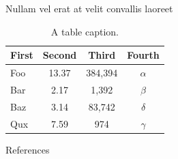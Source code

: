 \documentclass[final]{beamer}
\newlength{\sepwidth}
\newlength{\colwidth}
\newcommand{\separatorcolumn}{\begin{column}{\sepwidth}\end{column}}
\begin{document}
\begin{frame}[t]
\begin{columns}[t]
\begin{column}{\colwidth}
\begin{block}{Nullam vel erat at velit convallis laoreet}
    \begin{table}
      \centering
      \begin{tabular}{l c c c}
        \toprule
        \textbf{First} & \textbf{Second} & \textbf{Third} & \textbf{Fourth} \\
        \midrule
        Foo & 13.37 & 384,394 & $\alpha$ \\
        Bar & 2.17 & 1,392 & $\beta$ \\
        Baz & 3.14 & 83,742 & $\delta$ \\
        Qux & 7.59 & 974 & $\gamma$ \\
        \bottomrule
      \end{tabular}
      \caption{A table caption.}
    \end{table}

  \end{block}
  
  \begin{block}{References}
    \nocite{*}
        \vspace{-3mm}
        \footnotesize{}

  \end{block}
  
\end{column}

\separatorcolumn
\end{columns}
\end{frame}
\end{document}
